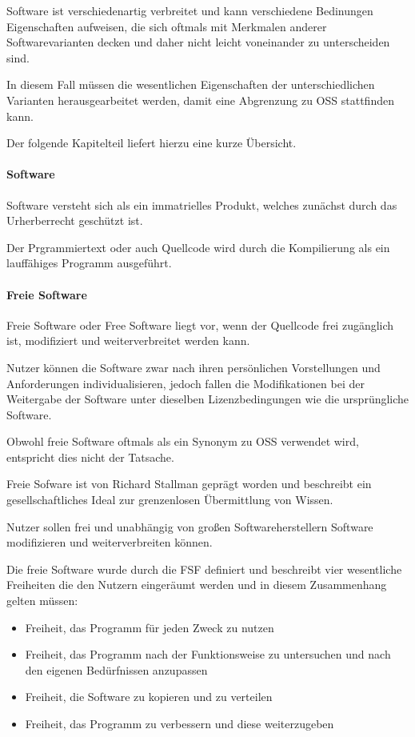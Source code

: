 Software ist verschiedenartig verbreitet und kann verschiedene Bedinungen Eigenschaften aufweisen, die sich oftmals mit Merkmalen anderer Softwarevarianten decken und daher nicht leicht voneinander zu unterscheiden sind. 

In diesem Fall müssen die wesentlichen Eigenschaften der unterschiedlichen Varianten herausgearbeitet werden, damit eine Abgrenzung zu OSS stattfinden kann.

Der folgende Kapitelteil liefert hierzu eine kurze Übersicht. 

\paragraph{Software}
Software versteht sich als ein immatrielles Produkt, welches zunächst durch das Urherberrecht geschützt ist. 

Der Prgrammiertext oder auch Quellcode wird durch die Kompilierung als ein lauffähiges Programm ausgeführt.

\paragraph{Freie Software}
Freie Software oder Free Software liegt vor, wenn der Quellcode frei zugänglich ist, modifiziert und weiterverbreitet werden kann. 

Nutzer können die Software zwar nach ihren persönlichen Vorstellungen und Anforderungen individualisieren, jedoch fallen die Modifikationen bei der Weitergabe der Software unter dieselben Lizenzbedingungen wie die ursprüngliche Software.  

Obwohl freie Software oftmals als ein Synonym zu OSS verwendet wird, entspricht dies nicht der Tatsache. 

Freie Sofware ist von Richard Stallman geprägt worden und beschreibt ein gesellschaftliches Ideal zur grenzenlosen Übermittlung von Wissen. \cite[s. 5]{wichmann_linux-_2005} 

Nutzer sollen frei und unabhängig von großen Softwareherstellern Software modifizieren und weiterverbreiten können. 

Die freie Software wurde durch die FSF definiert und beschreibt vier wesentliche Freiheiten die den Nutzern eingeräumt werden und in diesem Zusammenhang gelten müssen: 

\begin{itemize}
    \item Freiheit, das Programm für jeden Zweck zu nutzen
    \item Freiheit, das Programm nach der Funktionsweise zu untersuchen und nach den eigenen Bedürfnissen anzupassen
    \item Freiheit, die Software zu kopieren und zu verteilen
    \item Freiheit, das Programm zu verbessern und diese weiterzugeben
\end{itemize}

